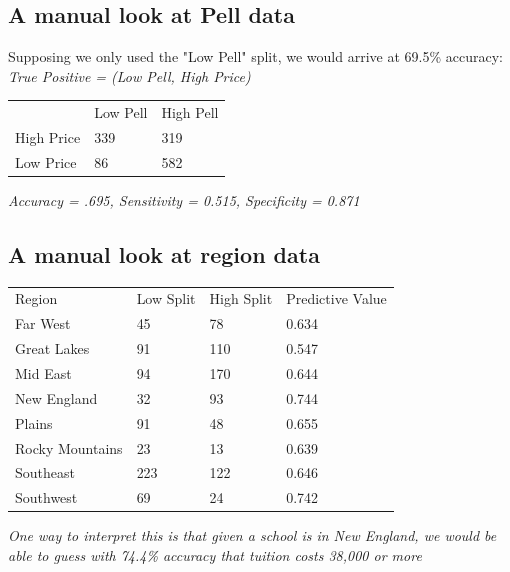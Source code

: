 \documentclass[12pt, a4, epsf] {article}
\theoremstyle{plain}
\theoremstyle{definition}
\begin{document}
\subsection*{A manual look at Pell data}
Supposing we only used the "Low Pell" split, we would arrive at 69.5\% accuracy:\\
\textit{True Positive = (Low Pell, High Price)}
\begin{table}[htbp]
\begin{tabular}{lll}
           & Low Pell & High Pell \\
High Price & 339      & 319       \\
Low Price  & 86       & 582      
\end{tabular}
\end{table}
\FloatBarrier
\textit{Accuracy = .695, Sensitivity = 0.515, Specificity = 0.871}
\subsection*{A manual look at region data}
\begin{table}[htbp]
\begin{tabular}{llll}
Region          & Low Split & High Split & Predictive Value \\
Far West        & 45        & 78         & 0.634            \\
Great Lakes     & 91        & 110        & 0.547            \\
Mid East        & 94        & 170        & 0.644            \\
New England     & 32        & 93         & 0.744            \\
Plains          & 91        & 48         & 0.655            \\
Rocky Mountains & 23        & 13         & 0.639            \\
Southeast       & 223       & 122        & 0.646            \\
Southwest       & 69        & 24         & 0.742           
\end{tabular}
\end{table}
\textit{One way to interpret this is that given a school is in New England, we would be able to guess with 74.4\% accuracy that tuition costs 38,000 or more}
\end{document}
